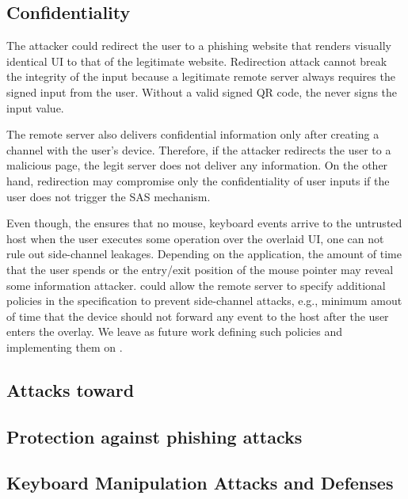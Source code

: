 \subsection{Confidentiality}

 The attacker could redirect the user to a phishing website that renders visually identical UI to that of the legitimate website. Redirection attack cannot break the integrity of the input because a legitimate remote server always requires the signed input from the user. Without a valid signed QR code, the \device never signs the input value. 

The remote server also delivers confidential information only after creating a \tls channel with the user's device. Therefore, if the attacker redirects the user to a malicious page, the legit server does not deliver any information. On the other hand, redirection may compromise only the confidentiality of user inputs if the user does not trigger the SAS mechanism. 

 Even though, the \device ensures that no mouse, keyboard events arrive to the untrusted host when the user executes some operation over the overlaid UI, one can not rule out side-channel leakages. Depending on the application, the amount of time that the user spends or the entry/exit position of the mouse pointer may reveal some information attacker. 
\device could allow the remote server to specify additional policies in the specification to prevent side-channel attacks, e.g., minimum amout of time that the device should not forward any event to the host after the user enters the overlay. We leave as future work defining such policies and implementing them on \name.




\subsection{Attacks toward \device}


\iffalse
\subsection{Protection against phishing attacks}
\subsection{Keyboard Manipulation Attacks and Defenses}
